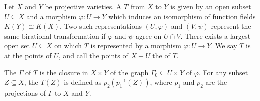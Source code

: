 Let $X$ and $Y$ be projective varieties. A  $T$ from $X$ to $Y$ is given by an open subset $U \subseteq X$ and a morphism $\varphi: U \rightarrow Y$ which induces an isomorphism of function fields $K(Y) \cong K(X)$. Two such representations $(U, \varphi)$ and $(V, \psi)$ represent the same birational transformation if $\varphi$ and $\psi$ agree on $U \cap V$. There exists a largest open set $U \subseteq X$ on which $T$ is represented by a morphism $\varphi: U \rightarrow Y$. We say $T$ is  at the points of $U$, and call the points of $X - U$ the  of $T$.

The  $\Gamma$ of $T$ is the closure in $X \times Y$ of the graph $\Gamma_0 \subseteq U \times Y$ of $\varphi$. For any subset $Z \subseteq X$, the  $T(Z)$ is defined as $p_2(p_1^{-1}(Z))$, where $p_1$ and $p_2$ are the projections of $\Gamma$ to $X$ and $Y$.
